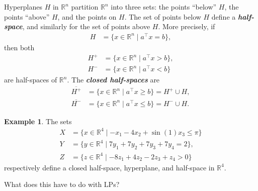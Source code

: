 \documentclass[a4paper, 12pt]{article}
\numberwithin{equation}{section}
\numberwithin{figure}{section}
\theoremstyle{definition}
\newtheorem{ex}[thm]{Example}
\renewcommand{\leq}{\leqslant}
\renewcommand{\geq}{\geqslant}
\newcommand{\R}{\mathbb{R}}
\newcommand{\define}[1]{\textbf{\textit{#1}}}
\begin{document}
Hyperplanes $H$ in $\R^n$ partition $\R^n$ into three sets: the points ``below''
$H$, the points ``above'' $H$, and the points on $H$. The set of points below
$H$ define a \define{half-space}, and similarly for the set of points above $H$. More precisely, if 
\begin{align*}
	H &= \{x\in \R^n \mid a^{\top}x = b\},
\end{align*}
then both 
\begin{align*}
	H^+ &= \{x\in \R^n \mid a^{\top}x > b \}, \\
	H^- &= \{x\in \R^n \mid a^{\top}x < b \}
\end{align*}
are half-spaces of $\R^n$. The \define{closed half-spaces} are 
\begin{align*}
	\overline{H^+} &= \{x\in \R^n \mid a^{\top}x \geq b \} = H^+ \cup H, \\
	\overline{H^-} &= \{x\in \R^n \mid a^{\top}x \leq b \} = H^- \cup H.
\end{align*}

\begin{ex}
	The sets 
	\begin{align*}
		X &= \{x\in \R^4 \mid -x_1 -4x_2 + \sin(1)x_3 \leq \pi \} \\
		Y &= \{y\in \R^4 \mid 7y_1 + 7y_2 + 7y_3 + 7y_4 = 2\}, \\
		Z &= \{z\in\R^4 \mid -8z_1 + 4z_2 - 2z_3 + z_4 > 0\}
	\end{align*}
	respectively define a closed half-space, hyperplane, and half-space in
	$\R^4$.
\end{ex}

What does this have to do with LPs?







\newpage

 

\end{document}
